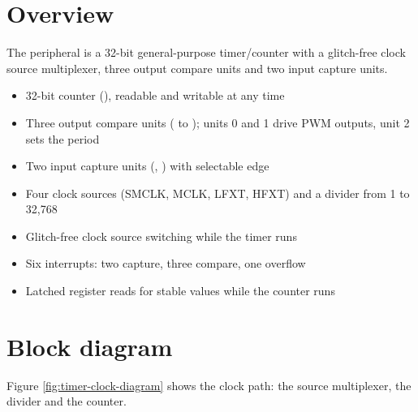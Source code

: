 \section{Overview}

The  peripheral is a 32-bit general-purpose timer/counter with a glitch-free clock source multiplexer, three output compare units and two input capture units.

\begin{itemize}
	\item 32-bit counter (), readable and writable at any time
	\item Three output compare units ( to ); units 0 and 1 drive PWM outputs, unit 2 sets the period
	\item Two input capture units (, ) with selectable edge
	\item Four clock sources (SMCLK, MCLK, LFXT, HFXT) and a divider from 1 to 32,768
	\item Glitch-free clock source switching while the timer runs
	\item Six interrupts: two capture, three compare, one overflow
	\item Latched register reads for stable values while the counter runs
\end{itemize}

\section{Block diagram}

Figure \ref{fig:timer-clock-diagram} shows the clock path: the source multiplexer, the divider and the counter.

